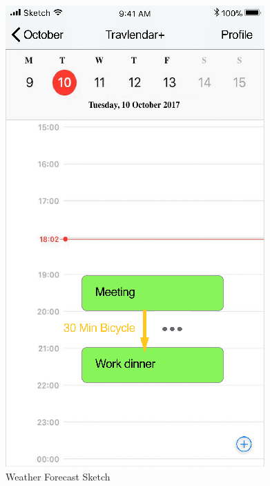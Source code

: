\begin{figure}[H]
	\includegraphics[scale=0.23]{Images/Interface/Weather_Forecast/2_rain}
	\caption{Weather Forecast Sketch}
\end{figure}

